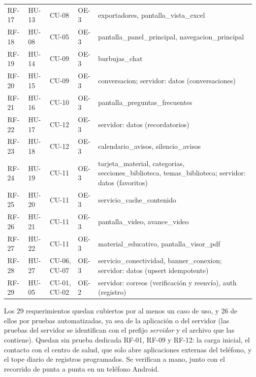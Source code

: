 \begin{xltabular}{\textwidth}{P{0.55}P{0.55}P{0.80}P{0.50}P{2.60}}
    RF-17 & HU-13 & CU-08 & OE-3 & exportadores, pantalla\_vista\_excel \\
    RF-18 & HU-08 & CU-05 & OE-3 & pantalla\_panel\_principal, navegacion\_principal \\
    RF-19 & HU-14 & CU-09 & OE-3 & burbujas\_chat \\
    RF-20 & HU-15 & CU-09 & OE-3 & conversacion; servidor: datos (conversaciones) \\
    RF-21 & HU-16 & CU-10 & OE-3 & pantalla\_preguntas\_frecuentes \\
    RF-22 & HU-17 & CU-12 & OE-3 & servidor: datos (recordatorios) \\
    RF-23 & HU-18 & CU-12 & OE-3 & calendario\_avisos, silencio\_avisos \\
    RF-24 & HU-19 & CU-11 & OE-3 & tarjeta\_material, categorias, secciones\_biblioteca, temas\_biblioteca; servidor: datos (favoritos) \\
    RF-25 & HU-20 & CU-11 & OE-3 & servicio\_cache\_contenido \\
    RF-26 & HU-21 & CU-11 & OE-3 & pantalla\_video, avance\_video \\
    RF-27 & HU-22 & CU-11 & OE-3 & material\_educativo, pantalla\_visor\_pdf \\
    RF-28 & HU-27 & CU-06, CU-07 & OE-3 & servicio\_conectividad, banner\_conexion; servidor: datos (upsert idempotente) \\
    RF-29 & HU-05 & CU-01, CU-02 & OE-2 & servidor: correos (verificación y reenvío), auth (registro) \\
\end{xltabular}
\endgroup

Los 29 requerimientos quedan cubiertos por al menos un caso de uso, y 26 de
ellos por pruebas automatizadas, ya sea de la aplicación o del servidor (las
pruebas del servidor se identifican con el prefijo \emph{servidor} y el archivo
que las contiene). Quedan sin prueba dedicada RF-01, RF-09 y RF-12: la carga
inicial, el contacto con el centro de salud, que solo abre aplicaciones externas
del teléfono, y el tope diario de registros programados. Se verifican a mano,
junto con el recorrido de punta a punta en un teléfono Android.
